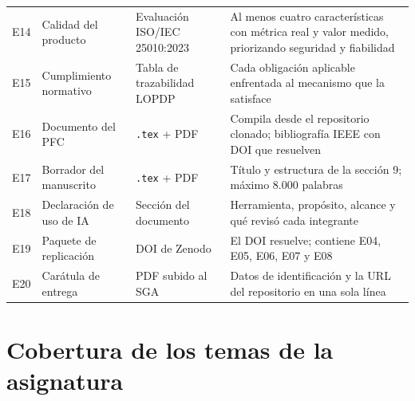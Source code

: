 \documentclass[11pt,a4paper]{article}
\begin{document}
\begin{center}
\begin{longtable}{@{}p{0.9cm}p{4.6cm}p{4.2cm}p{5.0cm}@{}}
		E14 & Calidad del producto & Evaluación ISO/IEC 25010:2023 & Al menos cuatro características con métrica real y valor medido, priorizando seguridad y fiabilidad \cite{iso25010_2023} \\
		E15 & Cumplimiento normativo & Tabla de trazabilidad LOPDP & Cada obligación aplicable enfrentada al mecanismo que la satisface \cite{lopdp2021} \\
		E16 & Documento del PFC & \texttt{.tex} + PDF & Compila desde el repositorio clonado; bibliografía IEEE con DOI que resuelven \\
		E17 & Borrador del manuscrito & \texttt{.tex} + PDF & Título y estructura de la sección 9; máximo 8.000 palabras \\
		E18 & Declaración de uso de IA & Sección del documento & Herramienta, propósito, alcance y qué revisó cada integrante \\
		E19 & Paquete de replicación & DOI de Zenodo & El DOI resuelve; contiene E04, E05, E06, E07 y E08 \\
		E20 & Carátula de entrega & PDF subido al SGA & Datos de identificación y la URL del repositorio en una sola línea \\
		\bottomrule
	\end{longtable}
\end{center}

\section{Cobertura de los temas de la asignatura}
\end{document}
